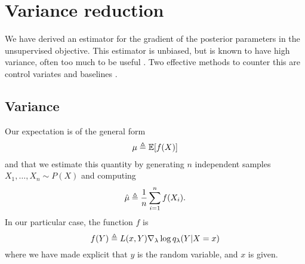 \section{Variance reduction}
  We have derived an estimator for the gradient of the posterior parameters in the unsupervised objective. This estimator is unbiased, but is known to have high variance, often too much to be useful \citep{paisley2012viss}. Two effective methods to counter this are control variates and baselines \citep{ross2006simulation}.

  \subsection{Variance}
  Our expectation is of the general form
  \begin{align*}
    \mu \triangleq \operatorname{\mathbb{E}} [ f(X) ]
  \end{align*}
  and that we estimate this quantity by generating $n$ independent samples $X_1,\dots,X_n \sim P(X)$ and computing
  \begin{align*}
    \hat{\mu} \triangleq \frac{1}{n} \sum_{i=1}^n f(X_i).
  \end{align*}
  In our particular case, the function $f$ is
  \begin{equation*}
    f(Y) \triangleq L(x,Y) \nabla_{\lambda} \log q_{\lambda}(Y|X=x)
  \end{equation*}
  where we have made explicit that $y$ is the random variable, and $x$ is given.

